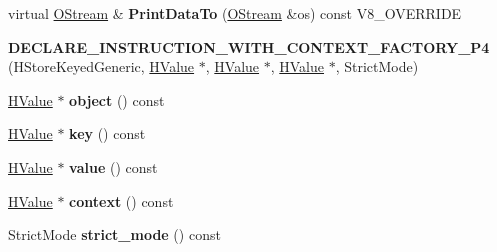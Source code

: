 \begin{DoxyCompactItemize}
\item 
\hypertarget{classv8_1_1internal_1_1_v8___f_i_n_a_l_ac450dad970b14246be761ccf5004924b}{}virtual \hyperlink{classv8_1_1internal_1_1_o_stream}{O\+Stream} \& {\bfseries Print\+Data\+To} (\hyperlink{classv8_1_1internal_1_1_o_stream}{O\+Stream} \&os) const V8\+\_\+\+O\+V\+E\+R\+R\+I\+D\+E\label{classv8_1_1internal_1_1_v8___f_i_n_a_l_ac450dad970b14246be761ccf5004924b}

\item 
\hypertarget{classv8_1_1internal_1_1_v8___f_i_n_a_l_a27043f0a3ed406cea8e67f5200ace69f}{}{\bfseries D\+E\+C\+L\+A\+R\+E\+\_\+\+I\+N\+S\+T\+R\+U\+C\+T\+I\+O\+N\+\_\+\+W\+I\+T\+H\+\_\+\+C\+O\+N\+T\+E\+X\+T\+\_\+\+F\+A\+C\+T\+O\+R\+Y\+\_\+\+P4} (H\+Store\+Keyed\+Generic, \hyperlink{classv8_1_1internal_1_1_h_value}{H\+Value} $\ast$, \hyperlink{classv8_1_1internal_1_1_h_value}{H\+Value} $\ast$, \hyperlink{classv8_1_1internal_1_1_h_value}{H\+Value} $\ast$, Strict\+Mode)\label{classv8_1_1internal_1_1_v8___f_i_n_a_l_a27043f0a3ed406cea8e67f5200ace69f}

\item 
\hypertarget{classv8_1_1internal_1_1_v8___f_i_n_a_l_a5cf72ed4b954f3413a0aa63069a75283}{}\hyperlink{classv8_1_1internal_1_1_h_value}{H\+Value} $\ast$ {\bfseries object} () const \label{classv8_1_1internal_1_1_v8___f_i_n_a_l_a5cf72ed4b954f3413a0aa63069a75283}

\item 
\hypertarget{classv8_1_1internal_1_1_v8___f_i_n_a_l_aecac5f6b59aaff1b8ba60417c772e136}{}\hyperlink{classv8_1_1internal_1_1_h_value}{H\+Value} $\ast$ {\bfseries key} () const \label{classv8_1_1internal_1_1_v8___f_i_n_a_l_aecac5f6b59aaff1b8ba60417c772e136}

\item 
\hypertarget{classv8_1_1internal_1_1_v8___f_i_n_a_l_a998b3feae0e84bbe080297551603911f}{}\hyperlink{classv8_1_1internal_1_1_h_value}{H\+Value} $\ast$ {\bfseries value} () const \label{classv8_1_1internal_1_1_v8___f_i_n_a_l_a998b3feae0e84bbe080297551603911f}

\item 
\hypertarget{classv8_1_1internal_1_1_v8___f_i_n_a_l_a8294bece2df148267ec52228e2139030}{}\hyperlink{classv8_1_1internal_1_1_h_value}{H\+Value} $\ast$ {\bfseries context} () const \label{classv8_1_1internal_1_1_v8___f_i_n_a_l_a8294bece2df148267ec52228e2139030}

\item 
\hypertarget{classv8_1_1internal_1_1_v8___f_i_n_a_l_a2aedf779fef90f5fec7b463341d87c42}{}Strict\+Mode {\bfseries strict\+\_\+mode} () const \label{classv8_1_1internal_1_1_v8___f_i_n_a_l_a2aedf779fef90f5fec7b463341d87c42}


\end{DoxyCompactItemize}
